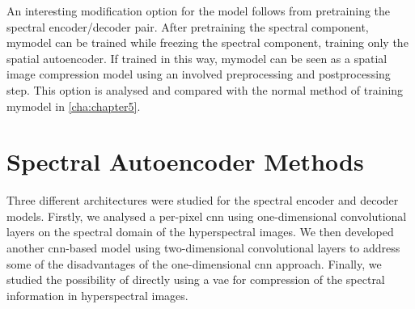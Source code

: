 An interesting modification option for the model follows from pretraining the spectral encoder/decoder pair. After pretraining the spectral component, \ac{mymodel} can be trained while freezing the spectral component, training only the spatial autoencoder. If trained in this way, \ac{mymodel} can be seen as a spatial image compression model using an involved preprocessing and postprocessing step. This option is analysed and compared with the normal method of training \ac{mymodel} in \autoref{cha:chapter5}.
\section{Spectral Autoencoder Methods}
Three different architectures were studied for the spectral encoder and decoder models. Firstly, we analysed a per-pixel \ac{cnn} using one-dimensional convolutional layers on the spectral domain of the hyperspectral images. We then developed another \ac{cnn}-based model using two-dimensional convolutional layers to address some of the disadvantages of the one-dimensional \ac{cnn} approach. Finally, we studied the possibility of directly using a \ac{vae} for compression of the spectral information in hyperspectral images. 
